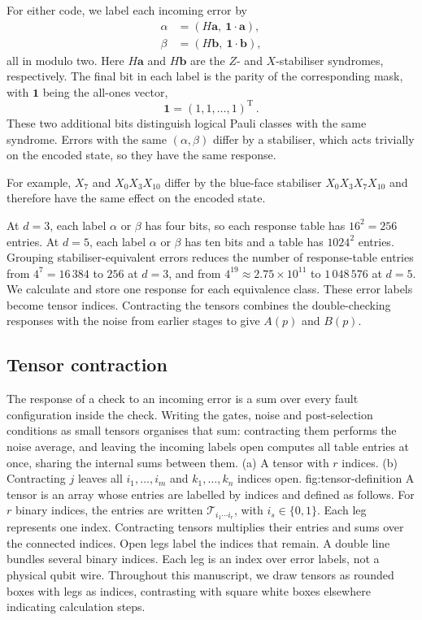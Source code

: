 For either code, we label each incoming error by
\begin{equation}
 \begin{aligned}
 \alpha&=(H\boldsymbol a,\ \boldsymbol1\cdot\boldsymbol a),\\
 \beta&=(H\boldsymbol b,\ \boldsymbol1\cdot\boldsymbol b),
 \end{aligned}
 \label{eq:address}
\end{equation}
all in modulo two. Here $H\boldsymbol a$ and
$H\boldsymbol b$ are the $Z$- and $X$-stabiliser syndromes,
respectively. The final bit in each label is the parity of the
corresponding mask, with $\boldsymbol1$ being the all-ones vector, 
\[
\boldsymbol1 = (1,1,\ldots,1)^{\text{T}} \ .
\]
These two additional bits distinguish logical Pauli classes
with the same syndrome.
Errors with the same $(\alpha,\beta)$ differ by a stabiliser, which acts trivially on the encoded state, so they have the same response.

For example, $X_7$ and $X_0X_3X_{10}$ differ by the blue-face
stabiliser $X_0X_3X_7X_{10}$ and therefore have the same effect
on the encoded state.


At $d=3$, each label $\alpha$ or $\beta$ has four bits, so each response table has
$16^2=256$ entries. At $d=5$, each label $\alpha$ or $\beta$ has ten bits and a table has
$1024^2$ entries. Grouping stabiliser-equivalent errors reduces the number of
response-table entries from $4^7=16\,384$ to $256$ at $d=3$,
and from $4^{19}\approx2.75\times10^{11}$ to
$1\,048\,576$ at $d=5$. We calculate and store one response
for each equivalence class.
These error labels become tensor indices. Contracting the tensors combines
the double-checking responses with the noise from earlier stages to give
$A(p)$ and $B(p)$.

\subsection{Tensor contraction}\label{sec:tensor-contraction}
The response of a check to an incoming error is a sum over every fault configuration inside the check. Writing the gates, noise and post-selection conditions as small tensors organises that sum: contracting them performs the noise average, and leaving the incoming labels open computes all table entries at once, sharing the internal sums between them.
{(a) A tensor with $r$ indices. (b) Contracting $j$ leaves all
$i_1,\ldots,i_m$ and $k_1,\ldots,k_n$ indices open.}
{fig:tensor-definition}
A tensor is an array whose entries are labelled by indices and defined as follows. For $r$ binary indices, the entries are written
$\mathcal T_{i_1\cdots i_r}$, with $i_s\in\{0,1\}$.
Each leg represents one index. Contracting tensors multiplies
their entries and sums over the connected indices. Open legs
label the indices that remain. A double line bundles several binary indices. Each leg is an index over error labels, not a physical qubit wire. Throughout this manuscript, we draw tensors as rounded boxes with legs as indices, contrasting with square white boxes elsewhere indicating calculation steps.

